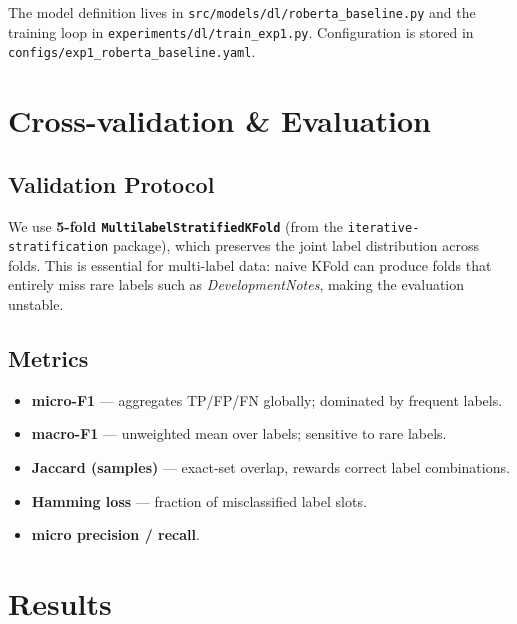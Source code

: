\documentclass[11pt,a4paper]{article}
\begin{document}
The model definition lives in \texttt{src/models/dl/roberta\_baseline.py} and the
training loop in \texttt{experiments/dl/train\_exp1.py}. Configuration is stored
in \texttt{configs/exp1\_roberta\_baseline.yaml}.

\section{Cross-validation \& Evaluation}
\label{sec:evaluation}

\subsection{Validation Protocol}

We use \textbf{5-fold \texttt{MultilabelStratifiedKFold}} (from the
\texttt{iterative-stratification} package), which preserves the joint label
distribution across folds. This is essential for multi-label data: naive KFold
can produce folds that entirely miss rare labels such as
\textit{DevelopmentNotes}, making the evaluation unstable.

\subsection{Metrics}

\begin{itemize}[nosep]
    \item \textbf{micro-F1} --- aggregates TP/FP/FN globally; dominated by
          frequent labels.
    \item \textbf{macro-F1} --- unweighted mean over labels; sensitive to rare
          labels.
    \item \textbf{Jaccard (samples)} --- exact-set overlap, rewards correct
          label combinations.
    \item \textbf{Hamming loss} --- fraction of misclassified label slots.
    \item \textbf{micro precision / recall}.
\end{itemize}

\section{Results}
\label{sec:results}
\end{document}
